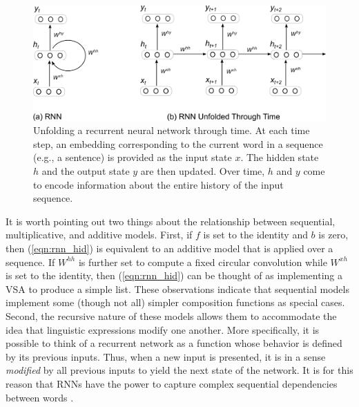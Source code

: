 \begin{figure}
\centering
	\includegraphics[width=5in]{figures/rnn.png}
	\caption{Unfolding a recurrent neural network through time. At each time step, an embedding corresponding to the current word in a sequence (e.g., a sentence) is provided as the input state $x$. The hidden state $h$ and the output state $y$ are then updated. Over time, $h$ and $y$ come to encode information about the entire history of the input sequence.}\label{fig:rnn}
\end{figure}

It is worth pointing out two things about the relationship between sequential, multiplicative, and additive models. First, if $f$ is set to the identity and $b$ is zero, then (\ref{eqn:rnn_hid}) is equivalent to an additive model that is applied over a sequence. If $W^{hh}$ is further set to compute a fixed circular convolution while $W^{xh}$ is set to the identity, then (\ref{eqn:rnn_hid}) can be thought of as implementing a VSA to produce a simple list. These observations indicate that sequential models implement some (though not all) simpler composition functions as special cases. Second, the recursive nature of these models allows them to accommodate the idea that linguistic expressions modify one another. More specifically, it is possible to think of a recurrent network as a function whose behavior is defined by its previous inputs. Thus, when a new input is presented, it is in a sense \textit{modified} by all previous inputs to yield the next state of the network. It is for this reason that RNNs have the power to capture complex sequential dependencies between words \citep{Elman:1991,Sutskever:2014}.

